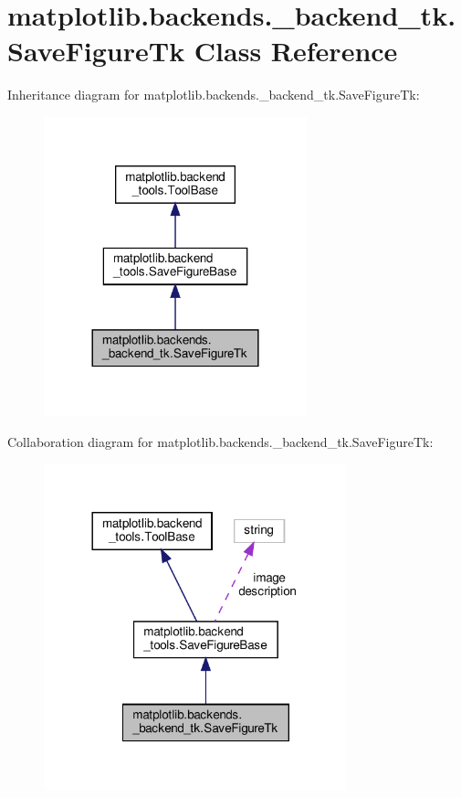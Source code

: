 \hypertarget{classmatplotlib_1_1backends_1_1__backend__tk_1_1SaveFigureTk}{}\section{matplotlib.\+backends.\+\_\+backend\+\_\+tk.\+Save\+Figure\+Tk Class Reference}
\label{classmatplotlib_1_1backends_1_1__backend__tk_1_1SaveFigureTk}


Inheritance diagram for matplotlib.\+backends.\+\_\+backend\+\_\+tk.\+Save\+Figure\+Tk\+:
\nopagebreak
\begin{figure}[H]
\begin{center}
\leavevmode
\includegraphics[width=216pt]{classmatplotlib_1_1backends_1_1__backend__tk_1_1SaveFigureTk__inherit__graph}
\end{center}
\end{figure}


Collaboration diagram for matplotlib.\+backends.\+\_\+backend\+\_\+tk.\+Save\+Figure\+Tk\+:
\nopagebreak
\begin{figure}[H]
\begin{center}
\leavevmode
\includegraphics[width=248pt]{classmatplotlib_1_1backends_1_1__backend__tk_1_1SaveFigureTk__coll__graph}
\end{center}
\end{figure}

